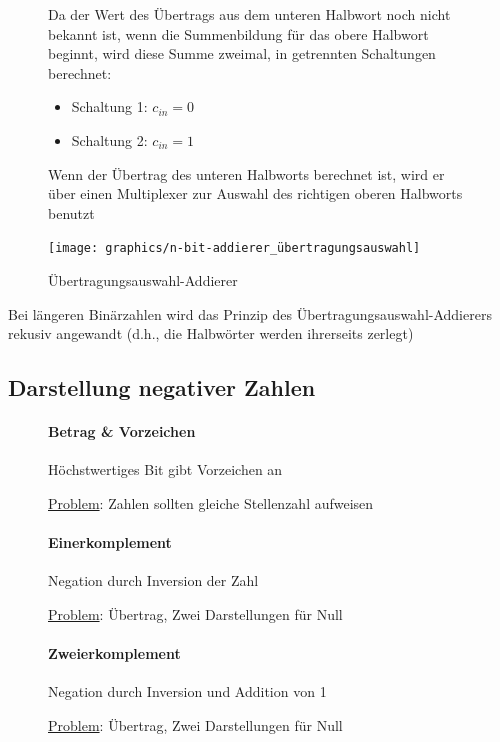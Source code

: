 \documentclass[12pt]{report}
\begin{document}
\begin{figure}[H]
  \begin{minipage}[t]{.45\textwidth}
    Da der Wert des Übertrags aus dem unteren Halbwort noch nicht bekannt ist, wenn die Summenbildung für das obere
    Halbwort beginnt, wird diese Summe zweimal, in getrennten Schaltungen berechnet:
    \begin{itemize}
      \item Schaltung 1: $c_{in} = 0$
      \item Schaltung 2: $c_{in} = 1$
    \end{itemize}
    \par Wenn der Übertrag des unteren Halbworts berechnet ist, wird er über einen 
    Multiplexer zur Auswahl des richtigen oberen Halbworts benutzt
  \end{minipage}
  \hfill
  \begin{minipage}[t]{.45\textwidth}
    \caption{Übertragungsauswahl-Addierer}
    \centering
    \texttt{[image: graphics/n-bit-addierer\_übertragungsauswahl]}
  \end{minipage}
\end{figure}

\begin{infobox}
  Bei längeren Binärzahlen wird das Prinzip des Übertragungsauswahl-Addierers rekusiv angewandt (d.h., die Halbwörter werden ihrerseits zerlegt)
\end{infobox}

\subsection{Darstellung negativer Zahlen}
\begin{figure}[H]
  \begin{minipage}[t]{.3\textwidth}
    \centering
    \paragraph{Betrag \& Vorzeichen}
    \small Höchstwertiges Bit gibt Vorzeichen an
    
    \underline{Problem}: Zahlen sollten gleiche Stellenzahl aufweisen
  \end{minipage}
  \hfill
  \begin{minipage}[t]{.3\textwidth}
    \centering
    \paragraph{Einerkomplement}
    \small Negation durch Inversion der Zahl
    
    \underline{Problem}: Übertrag, Zwei Darstellungen für Null
  \end{minipage}
  \hfill
  \begin{minipage}[t]{.3\textwidth}
    \centering
    \paragraph{Zweierkomplement}
    \small Negation durch Inversion und Addition von 1
    
    \underline{Problem}: Übertrag, Zwei Darstellungen für Null
  \end{minipage}
\end{figure}
\end{document}
